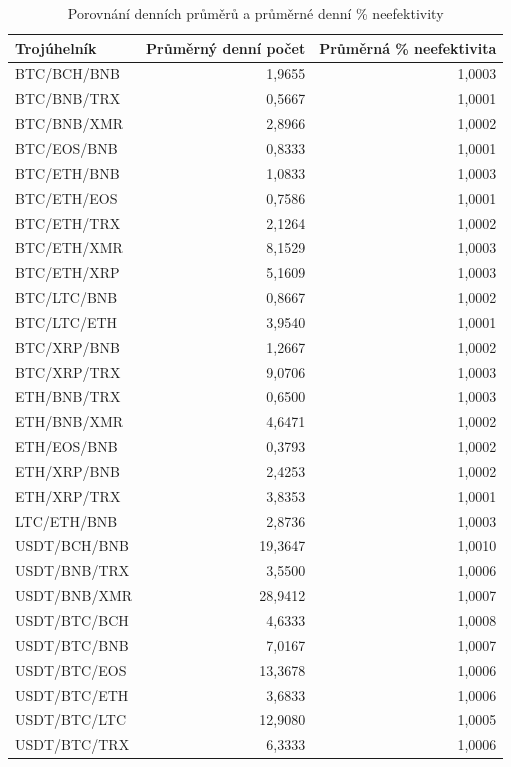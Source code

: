 \documentclass[thesis=B,czech]{FITthesis}[2019/03/21]
\begin{document}
\begin{table}\centering
\caption{Porovnání denních průměrů a průměrné denní \% neefektivity}
\label{table_averages}
\begin{tabular}{|| l | r | r ||}\hline Trojúhelník & Průměrný denní počet & Průměrná \% neefektivita\\
 \hline\hline BTC/BCH/BNB & 1,9655 & 1,0003\\ 
 \hline BTC/BNB/TRX & 0,5667 & 1,0001\\ 
 \hline BTC/BNB/XMR & 2,8966 & 1,0002\\ 
 \hline BTC/EOS/BNB & 0,8333 & 1,0001\\ 
 \hline BTC/ETH/BNB & 1,0833 & 1,0003\\ 
 \hline BTC/ETH/EOS & 0,7586 & 1,0001\\ 
 \hline BTC/ETH/TRX & 2,1264 & 1,0002\\ 
 \hline BTC/ETH/XMR & 8,1529 & 1,0003\\ 
 \hline BTC/ETH/XRP & 5,1609 & 1,0003\\ 
 \hline BTC/LTC/BNB & 0,8667 & 1,0002\\ 
 \hline BTC/LTC/ETH & 3,9540 & 1,0001\\ 
 \hline BTC/XRP/BNB & 1,2667 & 1,0002\\ 
 \hline BTC/XRP/TRX & 9,0706 & 1,0003\\ 
 \hline ETH/BNB/TRX & 0,6500 & 1,0003\\ 
 \hline ETH/BNB/XMR & 4,6471 & 1,0002\\ 
 \hline ETH/EOS/BNB & 0,3793 & 1,0002\\ 
 \hline ETH/XRP/BNB & 2,4253 & 1,0002\\ 
 \hline ETH/XRP/TRX & 3,8353 & 1,0001\\ 
 \hline LTC/ETH/BNB & 2,8736 & 1,0003\\ 
 \hline USDT/BCH/BNB & 19,3647 & 1,0010\\ 
 \hline USDT/BNB/TRX & 3,5500 & 1,0006\\ 
 \hline USDT/BNB/XMR & 28,9412 & 1,0007\\ 
 \hline USDT/BTC/BCH & 4,6333 & 1,0008\\ 
 \hline USDT/BTC/BNB & 7,0167 & 1,0007\\ 
 \hline USDT/BTC/EOS & 13,3678 & 1,0006\\ 
 \hline USDT/BTC/ETH & 3,6833 & 1,0006\\ 
 \hline USDT/BTC/LTC & 12,9080 & 1,0005\\ 
 \hline USDT/BTC/TRX & 6,3333 & 1,0006\\ 

\end{tabular}
\end{table}
\end{document}
